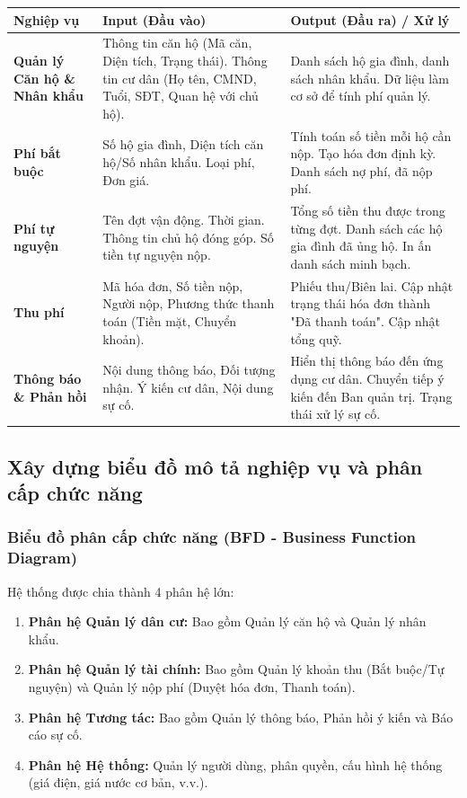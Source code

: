 \documentclass[12pt,a4paper]{article}
\begin{document}
\begin{table}[H]
    \centering
    \begin{tabularx}{\textwidth}{|L{3cm}|X|X|}
    \hline
    \textbf{Nghiệp vụ} & \textbf{Input (Đầu vào)} & \textbf{Output (Đầu ra) / Xử lý} \\
    \hline
    \textbf{Quản lý Căn hộ \& Nhân khẩu} & Thông tin căn hộ (Mã căn, Diện tích, Trạng thái). Thông tin cư dân (Họ tên, CMND, Tuổi, SĐT, Quan hệ với chủ hộ). & Danh sách hộ gia đình, danh sách nhân khẩu. Dữ liệu làm cơ sở để tính phí quản lý. \\
    \hline
    \textbf{Phí bắt buộc} & Số hộ gia đình, Diện tích căn hộ/Số nhân khẩu. Loại phí, Đơn giá. & Tính toán số tiền mỗi hộ cần nộp. Tạo hóa đơn định kỳ. Danh sách nợ phí, đã nộp phí. \\
    \hline
    \textbf{Phí tự nguyện} & Tên đợt vận động. Thời gian. Thông tin chủ hộ đóng góp. Số tiền tự nguyện nộp. & Tổng số tiền thu được trong từng đợt. Danh sách các hộ gia đình đã ủng hộ. In ấn danh sách minh bạch. \\
    \hline
    \textbf{Thu phí} & Mã hóa đơn, Số tiền nộp, Người nộp, Phương thức thanh toán (Tiền mặt, Chuyển khoản). & Phiếu thu/Biên lai. Cập nhật trạng thái hóa đơn thành "Đã thanh toán". Cập nhật tổng quỹ. \\
    \hline
    \textbf{Thông báo \& Phản hồi} & Nội dung thông báo, Đối tượng nhận. Ý kiến cư dân, Nội dung sự cố. & Hiển thị thông báo đến ứng dụng cư dân. Chuyển tiếp ý kiến đến Ban quản trị. Trạng thái xử lý sự cố. \\
    \hline
    \end{tabularx}
\end{table}

\subsection{Xây dựng biểu đồ mô tả nghiệp vụ và phân cấp chức năng}

\subsubsection{Biểu đồ phân cấp chức năng (BFD - Business Function Diagram)}
Hệ thống được chia thành 4 phân hệ lớn:
\begin{enumerate}
    \item \textbf{Phân hệ Quản lý dân cư:} Bao gồm Quản lý căn hộ và Quản lý nhân khẩu.
    \item \textbf{Phân hệ Quản lý tài chính:} Bao gồm Quản lý khoản thu (Bắt buộc/Tự nguyện) và Quản lý nộp phí (Duyệt hóa đơn, Thanh toán).
    \item \textbf{Phân hệ Tương tác:} Bao gồm Quản lý thông báo, Phản hồi ý kiến và Báo cáo sự cố.
    \item \textbf{Phân hệ Hệ thống:} Quản lý người dùng, phân quyền, cấu hình hệ thống (giá điện, giá nước cơ bản, v.v.).
\end{enumerate}
\end{document}
